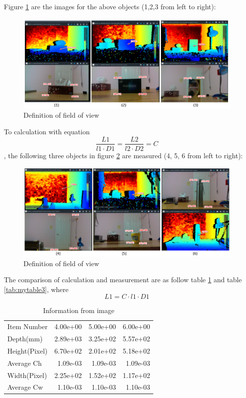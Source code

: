 \documentclass[
  oneside]{ubcthesis}
\begin{document}
Figure \ref{fig:figure6} are the images for the above objects (1,2,3 from left to right):

\begin{figure}

{\centering \includegraphics[width=0.9\linewidth]{figures/6} 

}

\caption{Definition of field of view}\label{fig:figure6}
\end{figure}



To calculation with equation \[\frac{L1}{l1 \cdot D1} = \frac{L2}{l2 \cdot D2} = C\], the following three objects in figure \ref{fig:figure7} are measured (4, 5, 6 from left to right):

\begin{figure}

{\centering \includegraphics[width=0.9\linewidth]{figures/7} 

}

\caption{Definition of field of view}\label{fig:figure7}
\end{figure}



The comparison of calculation and measurement are as follow table \ref{tab:mytable2} and table \ref{tab:mytable3}, where \[L1 = C \cdot l1 \cdot D1\]

\begin{table}

\caption{\label{tab:mytable2}Information from image}
\centering
\begin{tabular}[t]{lrrr}
\toprule
Item Number & 4.00e+00 & 5.00e+00 & 6.00e+00\\
Depth(mm) & 2.89e+03 & 3.25e+02 & 5.57e+02\\
Height(Pixel) & 6.70e+02 & 2.01e+02 & 5.18e+02\\
Average Ch & 1.09e-03 & 1.09e-03 & 1.09e-03\\
Width(Pixel) & 2.25e+02 & 1.52e+02 & 1.17e+02\\
\addlinespace
Average Cw & 1.10e-03 & 1.10e-03 & 1.10e-03\\
\bottomrule
\end{tabular}
\end{table}
\end{document}
